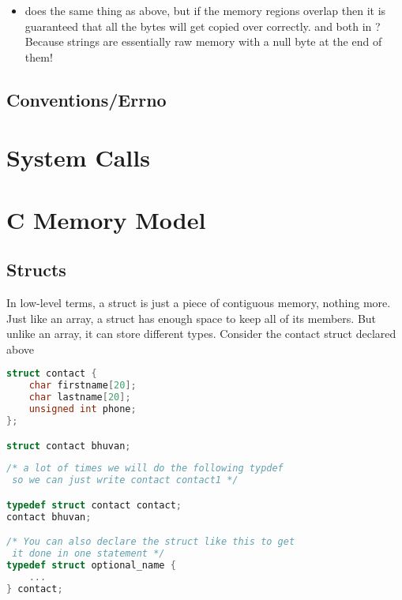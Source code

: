 \begin{itemize}
\item {} does the same thing as above, but if the memory regions overlap then it is guaranteed that all the bytes will get copied over correctly.  and  both in ? Because strings are essentially raw memory with a null byte at the end of them! 

\end{itemize}

\subsection{Conventions/Errno}


\section{System Calls}


\section{C Memory Model}

\subsection{Structs}

In low-level terms, a struct is just a piece of contiguous memory, nothing more. Just like an array, a struct has enough space to keep all of its members. But unlike an array, it can store different types. Consider the contact struct declared above

\begin{lstlisting}[language=C]
struct contact {
    char firstname[20];
    char lastname[20];
    unsigned int phone;
};

struct contact bhuvan;
\end{lstlisting}

\begin{lstlisting}[language=C]
/* a lot of times we will do the following typdef
 so we can just write contact contact1 */

typedef struct contact contact;
contact bhuvan;

/* You can also declare the struct like this to get
 it done in one statement */
typedef struct optional_name {
    ...
} contact;
\end{lstlisting}

